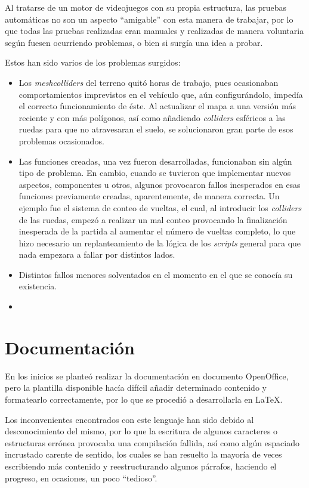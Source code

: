 Al tratarse de un motor de videojuegos con su propia estructura, las pruebas automáticas no son un aspecto ``amigable'' con esta manera de trabajar, por lo que todas las pruebas realizadas eran manuales y realizadas de manera voluntaria según fuesen ocurriendo problemas, o bien si surgía una idea a probar.

Estos han sido varios de los problemas surgidos:
\begin{itemize}
\tightlist
	\item Los \textit{meshcolliders} del terreno quitó horas de trabajo, pues ocasionaban comportamientos imprevistos en el vehículo que, aún configurándolo, impedía el correcto funcionamiento de éste. Al actualizar el mapa a una versión más reciente y con más polígonos, así como añadiendo \textit{colliders} esféricos a las ruedas para que no atravesaran el suelo, se solucionaron gran parte de esos problemas ocasionados.
	\item Las funciones creadas, una vez fueron desarrolladas, funcionaban sin algún tipo de problema. En cambio, cuando se tuvieron que implementar nuevos aspectos, componentes u otros, algunos provocaron fallos inesperados en esas funciones previamente creadas, aparentemente, de manera correcta. Un ejemplo fue el sistema de conteo de vueltas, el cual, al introducir los \textit{colliders} de las ruedas, empezó a realizar un mal conteo provocando la finalización inesperada de la partida al aumentar el número de vueltas completo, lo que hizo necesario un replanteamiento de la lógica de los \textit{scripts} general para que nada empezara a fallar por distintos lados.
	\item Distintos fallos menores solventados en el momento en el que se conocía su existencia.
	\item 
\end{itemize}

\section{Documentación}

En los inicios se planteó realizar la documentación en documento OpenOffice, pero la plantilla disponible hacía difícil añadir determinado contenido y formatearlo correctamente, por lo que se procedió a desarrollarla en LaTeX. 

Los inconvenientes encontrados con este lenguaje han sido debido al desconocimiento del mismo, por lo que la escritura de algunos caracteres o estructuras errónea provocaba una compilación fallida, así como algún espaciado incrustado carente de sentido, los cuales se han resuelto la mayoría de veces escribiendo más contenido y reestructurando algunos párrafos, haciendo el progreso, en ocasiones, un poco ``tedioso''.

